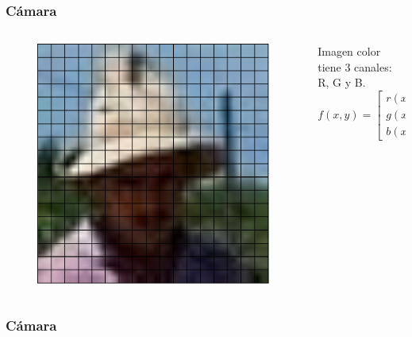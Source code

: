 \begin{frame}
    \frametitle{Cámara}
    
    
    \begin{columns}
    	\begin{column}{0.5\textwidth}
		    \begin{figure}[!h]
			\includegraphics[width=0.6\columnwidth]{images/image_pixels.pdf}
			\end{figure}
    	\end{column}
    	\begin{column}{0.3\textwidth}
		Imagen color tiene 3 canales: R, G y B.
		\begin{equation*}
			f(x,y)=
			\begin{bmatrix}
				r(x,y) \\
				g(x,y) \\
				b(x,y)
			\end{bmatrix}
		\end{equation*}
    	\end{column}
    \end{columns}
\end{frame}

\begin{frame}
	\frametitle{Cámara}
	
\end{frame}
